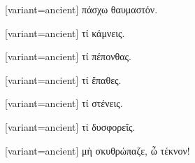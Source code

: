 %
%

\switchcolumn

\begin{greek}[variant=ancient]%
πάσχω θαυμαστόν.

\end{greek}%
\switchcolumn*

%

\switchcolumn

\begin{greek}[variant=ancient]%
τί κάμνεις.

\end{greek}%
\switchcolumn*

%
%

\switchcolumn

\begin{greek}[variant=ancient]%
τί πέπονθας.

\end{greek}%
\switchcolumn*

%
%

\switchcolumn

\begin{greek}[variant=ancient]%
τί ἔπαθες.

\end{greek}%
\switchcolumn*

%
%

\switchcolumn

\begin{greek}[variant=ancient]%
τί στένεις.

\end{greek}%
\switchcolumn*

%
%

\switchcolumn

\begin{greek}[variant=ancient]%
τί δυσφορεῖς.

\end{greek}%
\switchcolumn*

%
%

\switchcolumn

\begin{greek}[variant=ancient]%
μὴ σκυθρώπαζε, ὦ τέκνον!

\end{greek}%
\switchcolumn*

